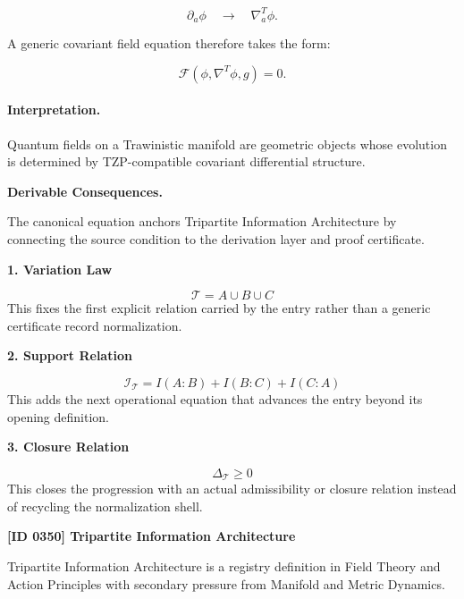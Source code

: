 \begin{equation}
\partial_a\phi
\quad\longrightarrow\quad
\nabla^T_a\phi .
\end{equation}

A generic covariant field equation therefore takes the form:

\begin{equation}
\mathcal{F}
\left(
\phi,\nabla^T\phi,g
\right)
=
0 .
\end{equation}

\paragraph{Interpretation.}
Quantum fields on a Trawinistic manifold are geometric objects whose evolution is determined by TZP-compatible covariant differential structure.

\par\vspace{0.35em}
\noindent\textbf{Derivable Consequences.}\quad
\begingroup
\footnotesize
\raggedright
The canonical equation anchors Tripartite Information Architecture by connecting the source condition to the derivation layer and proof certificate.
\par\endgroup

\noindent\textbf{1. Variation Law}\par
\[
\mathcal{T}=A\cup B\cup C
\]
\noindent This fixes the first explicit relation carried by the entry rather than a generic certificate record normalization.\par
\noindent\textbf{2. Support Relation}\par
\[
\mathcal{I}_{\mathcal{T}}=I(A:B)+I(B:C)+I(C:A)
\]
\noindent This adds the next operational equation that advances the entry beyond its opening definition.\par
\noindent\textbf{3. Closure Relation}\par
\[
\Delta_{\mathcal{T}}\geq 0
\]
\noindent This closes the progression with an actual admissibility or closure relation instead of recycling the normalization shell.\par

\clearpage
\noindent\textbf{[ID 0350] Tripartite Information Architecture}\par
\vspace{0.35em}
\begingroup\small
{}
Tripartite Information Architecture is a registry definition in Field Theory and Action Principles with secondary pressure from Manifold and Metric Dynamics.

